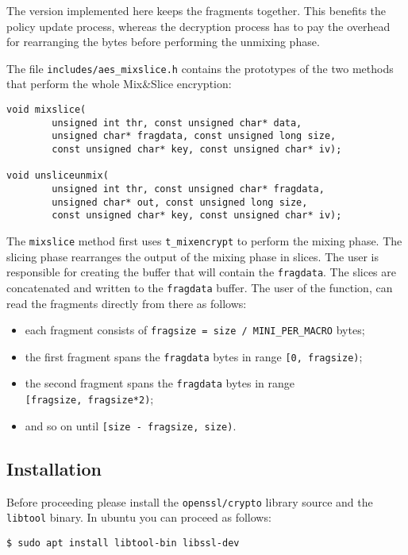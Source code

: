 The version implemented here keeps the fragments together. This benefits
the policy update process, whereas the decryption process has to pay the
overhead for rearranging the bytes before performing the unmixing phase.

The file \texttt{includes/aes\_mixslice.h} contains the prototypes of
the two methods that perform the whole Mix\&Slice encryption:

\begin{verbatim}
void mixslice(
        unsigned int thr, const unsigned char* data,
        unsigned char* fragdata, const unsigned long size,
        const unsigned char* key, const unsigned char* iv);

void unsliceunmix(
        unsigned int thr, const unsigned char* fragdata,
        unsigned char* out, const unsigned long size,
        const unsigned char* key, const unsigned char* iv);
\end{verbatim}

The \texttt{mixslice} method first uses \texttt{t\_mixencrypt} to
perform the mixing phase. The slicing phase rearranges the output of the
mixing phase in slices. The user is responsible for creating the buffer
that will contain the \texttt{fragdata}. The slices are concatenated and
written to the \texttt{fragdata} buffer. The user of the function, can
read the fragments directly from there as follows:

\begin{itemize}
\tightlist
\item
  each fragment consists of
  \texttt{fragsize\ =\ size\ /\ MINI\_PER\_MACRO} bytes;
\item
  the first fragment spans the \texttt{fragdata} bytes in range
  \texttt{{[}0,\ fragsize)};
\item
  the second fragment spans the \texttt{fragdata} bytes in range
  \texttt{{[}fragsize,\ fragsize*2)};
\item
  and so on until \texttt{{[}size\ -\ fragsize,\ size)}.
\end{itemize}


\subsection{Installation}

Before proceeding please install the \texttt{openssl/crypto} library
source and the \texttt{libtool} binary. In ubuntu you can proceed as
follows:

\begin{verbatim}
$ sudo apt install libtool-bin libssl-dev
\end{verbatim}

